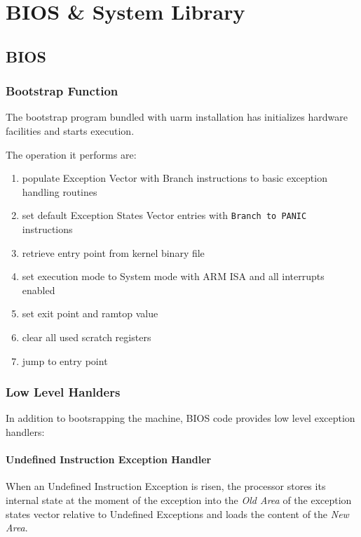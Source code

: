 \chapter{BIOS \& System Library}

\section{BIOS}

\subsection{Bootstrap Function}

The bootstrap program bundled with uarm installation has initializes hardware facilities and starts execution.

The operation it performs are:

\begin{enumerate}
\item populate Exception Vector with Branch instructions to basic exception handling routines
\item set default Exception States Vector entries with \texttt{Branch to PANIC} instructions
\item retrieve entry point from kernel binary file
\item set execution mode to System mode with ARM ISA and all interrupts enabled
\item set exit point and ramtop value
\item clear all used scratch registers
\item jump to entry point
\end{enumerate}

\subsection{Low Level Hanlders}

In addition to bootsrapping the machine, BIOS code provides low level exception handlers:

\subsubsection{Undefined Instruction Exception Handler}

When an Undefined Instruction Exception is risen, the processor stores its internal state at the moment of the exception into the \emph{Old Area} of the exception states vector relative to Undefined Exceptions and loads the content of the \emph{New Area}.

